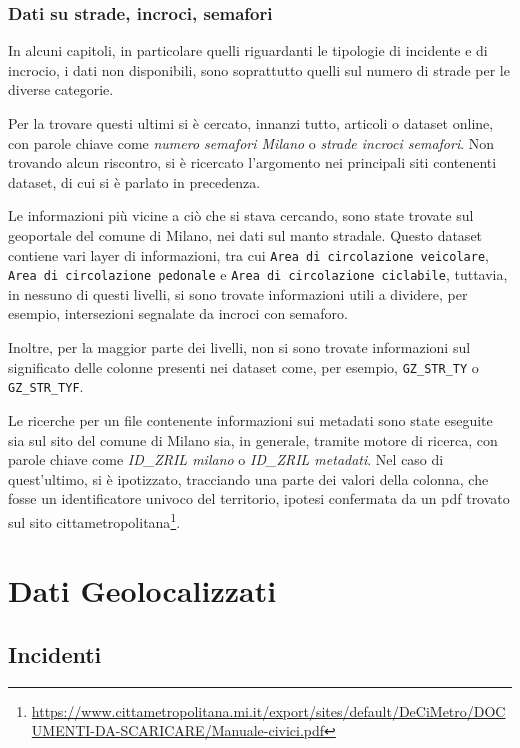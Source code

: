 \documentclass[a4paper,12pt]{report}
\newcommand{\columnstyle}[1]{\texttt{#1}}
\newcommand{\quotestyle}[1]{\textit{#1}}
\begin{document}
\subsection{Dati su strade, incroci, semafori}

In alcuni capitoli, in particolare quelli riguardanti le tipologie di incidente e 
di incrocio, i dati non disponibili, sono soprattutto quelli sul 
numero di strade per le diverse categorie.

Per la trovare questi ultimi si è cercato, innanzi tutto, articoli o dataset online, con 
parole chiave come \quotestyle{numero semafori Milano} o \quotestyle{strade incroci semafori}.
Non trovando alcun riscontro, si è ricercato l'argomento nei principali siti contenenti 
dataset, di cui si è parlato in precedenza. 

Le informazioni più vicine a ciò che si stava cercando, sono state trovate sul geoportale 
del comune di Milano, nei dati sul manto stradale.
Questo dataset contiene vari layer di informazioni, tra cui 
\columnstyle{Area di circolazione veicolare}, 
\columnstyle{Area di circolazione pedonale} e \columnstyle{Area di circolazione ciclabile}, 
tuttavia, in nessuno di questi livelli, si sono trovate informazioni utili a dividere, 
per esempio, intersezioni segnalate da incroci con semaforo. 

Inoltre, per la maggior parte dei livelli, non si sono trovate informazioni sul significato 
delle colonne presenti nei dataset come, per esempio, \columnstyle{GZ\_STR\_TY} o 
\columnstyle{GZ\_STR\_TYF}. 

Le ricerche per un file contenente informazioni sui metadati sono state eseguite sia 
sul sito del comune di Milano sia, in generale, tramite motore di ricerca, con parole chiave 
come \quotestyle{ID\_ZRIL milano} o \quotestyle{ID\_ZRIL metadati}. 
Nel caso di quest'ultimo, si è ipotizzato, tracciando una parte dei valori della colonna, 
che fosse un identificatore univoco del territorio, ipotesi confermata da un pdf trovato sul sito 
cittametropolitana\footnote{\url{https://www.cittametropolitana.mi.it/export/sites/default/DeCiMetro/DOCUMENTI-DA-SCARICARE/Manuale-civici.pdf}}. 

\chapter{Dati Geolocalizzati}

\section{Incidenti}
\end{document}
